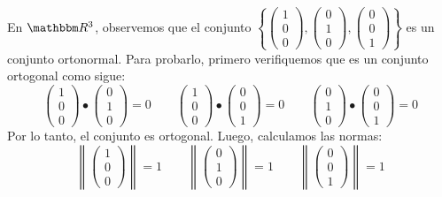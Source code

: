 \begin{example}
    En $\RR[3]$, observemos que el conjunto $\left\{ \begin{pmatrix} 1 \\ 0 \\ 0 \end{pmatrix}, \begin{pmatrix} 0 \\ 1 \\ 0 \end{pmatrix}, \begin{pmatrix} 0 \\ 0 \\ 1 \end{pmatrix} \right\}$ es un conjunto ortonormal. Para probarlo, primero verifiquemos que es un conjunto ortogonal como sigue:
    $$\begin{pmatrix} 1 \\ 0 \\ 0 \end{pmatrix} \bullet \begin{pmatrix} 0 \\ 1 \\ 0 \end{pmatrix} = 0 \qquad \begin{pmatrix} 1 \\ 0 \\ 0 \end{pmatrix} \bullet \begin{pmatrix} 0 \\ 0 \\ 1 \end{pmatrix} = 0 \qquad \begin{pmatrix} 0 \\ 1 \\ 0 \end{pmatrix} \bullet \begin{pmatrix} 0 \\ 0 \\ 1 \end{pmatrix} = 0$$\newpage\noindent
    Por lo tanto, el conjunto es ortogonal. Luego, calculamos las normas:
    $$\left\| \begin{pmatrix} 1 \\ 0 \\ 0 \end{pmatrix} \right\| = 1 \qquad \left\| \begin{pmatrix} 0 \\ 1 \\ 0 \end{pmatrix} \right\| = 1 \qquad \left\| \begin{pmatrix} 0 \\ 0 \\ 1 \end{pmatrix} \right\| = 1$$

\end{example}
